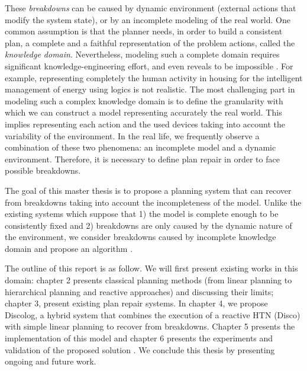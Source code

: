 These {\em breakdowns} can be caused by dynamic environment (external actions that modify the system state), or by an incomplete modeling of the real world. One common assumption is that the planner needs, in order to build a consistent plan, a complete and a faithful representation of the problem actions, called the \emph{knowledge domain}. 
Nevertheless, modeling such a complete domain requires significant knowledge-engineering effort, and even reveals to be impossible  \cite{gil1992acquiring}. For example, representing completely  the human activity in housing for the intelligent management of energy \cite{hurauxmodele} using logics is not realistic. The most challenging part in  modeling such a complex knowledge domain is to define the granularity with which we can construct a model  representing  accurately  the real world. This  implies representing each  action and the used devices taking into account the variability of the environment. 
  In the real life, we frequently observe a combination of these two phenomena: an incomplete model and a dynamic environment. Therefore, it is necessary to define plan repair in order to face possible breakdowns. 
\par The goal of this master thesis is to propose a planning system that can recover from breakdowns taking into account the incompleteness of the model. Unlike the existing systems which suppose that 1) the model is  complete enough to be consistently fixed and  2) breakdowns are only caused by the dynamic nature of the environment, we consider breakdowns caused by incomplete knowledge domain and propose an algorithm . 
\par The outline of this report is as follow. We will first present  existing works in this domain: chapter 2 presents classical planning methods (from linear planning to hierarchical planning and  reactive approaches) and discussing their limits; chapter 3, present existing plan repair systems. In chapter 4, we propose Discolog, a hybrid system that combines the execution of a reactive HTN (Disco) with simple linear planning  to recover from breakdowns.  Chapter 5 presents the  implementation of this model and chapter 6  presents the experiments and validation of the proposed solution . We conclude this thesis by presenting ongoing and future work.